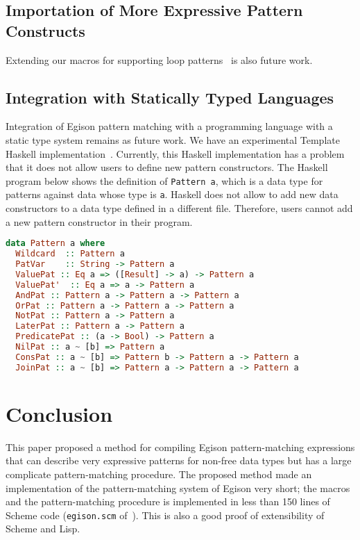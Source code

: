 \documentclass[acmlarge]{acmart}
\begin{document}
\subsection{Importation of More Expressive Pattern Constructs}

Extending our macros for supporting loop patterns~\cite{egi2018loop} is also future work.

\subsection{Integration with Statically Typed Languages}

Integration of Egison pattern matching with a programming language with a static type system remains as future work.
We have an experimental Template Haskell implementation~\cite{egisonHaskell}.
Currently, this Haskell implementation has a problem that it does not allow users to define new pattern constructors.
The Haskell program below shows the definition of \texttt{Pattern a}, which is a data type for patterns against data whose type is \texttt{a}.
Haskell does not allow to add new data constructors to a data type defined in a different file.
Therefore, users cannot add a new pattern constructor in their program.

\begin{lstlisting}[language=haskell]
data Pattern a where
  Wildcard  :: Pattern a
  PatVar    :: String -> Pattern a
  ValuePat :: Eq a => ([Result] -> a) -> Pattern a
  ValuePat'  :: Eq a => a -> Pattern a
  AndPat :: Pattern a -> Pattern a -> Pattern a
  OrPat :: Pattern a -> Pattern a -> Pattern a
  NotPat :: Pattern a -> Pattern a
  LaterPat :: Pattern a -> Pattern a
  PredicatePat :: (a -> Bool) -> Pattern a
  NilPat :: a ~ [b] => Pattern a
  ConsPat :: a ~ [b] => Pattern b -> Pattern a -> Pattern a
  JoinPat :: a ~ [b] => Pattern a -> Pattern a -> Pattern a
\end{lstlisting}

\section{Conclusion}\label{conclusion}

This paper proposed a method for compiling Egison pattern-matching expressions that can describe very expressive patterns for non-free data types but has a large complicate pattern-matching procedure.
The proposed method made an implementation of the pattern-matching system of Egison very short; the macros and the pattern-matching procedure is implemented in less than 150 lines of Scheme code (\texttt{egison.scm} of~\cite{egisonScheme}).
This is also a good proof of extensibility of Scheme and Lisp.
\end{document}
